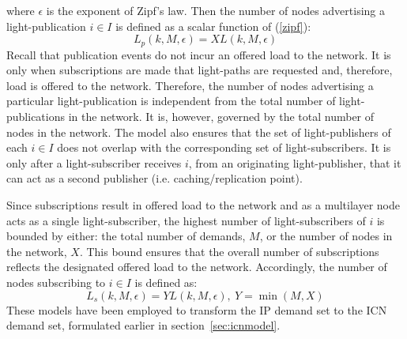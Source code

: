 \documentclass[journal]{IEEEtran}
\begin{document}
where $\epsilon$ is the exponent of Zipf's law. Then the number of nodes advertising a light-publication $i \in I$ is defined as a scalar function of (\ref{zipf}):
\begin{equation}
L_p(k,M,\epsilon) = X L(k,M,\epsilon)
\end{equation} 
Recall that publication events do not incur an offered load to the network. It is only when subscriptions are made that light-paths are requested and, therefore, load is offered to the network.
Therefore, the number of nodes advertising a particular light-publication is independent from the total number of light-publications in the network. It is, however, governed by the total number of nodes in the network. The model also ensures that the set of light-publishers of each $i \in I$ does not overlap with the corresponding set of light-subscribers. It is only after a light-subscriber receives $i$, from an originating light-publisher, that it can act as a second publisher (i.e. caching/replication point).

Since subscriptions result in offered load to the network and as a multilayer node acts as a single light-subscriber, the highest number of light-subscribers of $i$ is bounded by either: the total number of demands, $M$, or the number of nodes in the network, $X$. This bound ensures that the overall number of subscriptions reflects the designated offered load to the network.
Accordingly, the number of nodes subscribing to $i \in I$ is defined as:
\begin{equation}
L_s(k,M,\epsilon) = Y  L(k,M,\epsilon) , \ Y = \min(M,X)
\end{equation}
These models have been employed to transform the IP demand set to the ICN demand set, formulated earlier in section~\ref{sec:icnmodel}.
\end{document}
